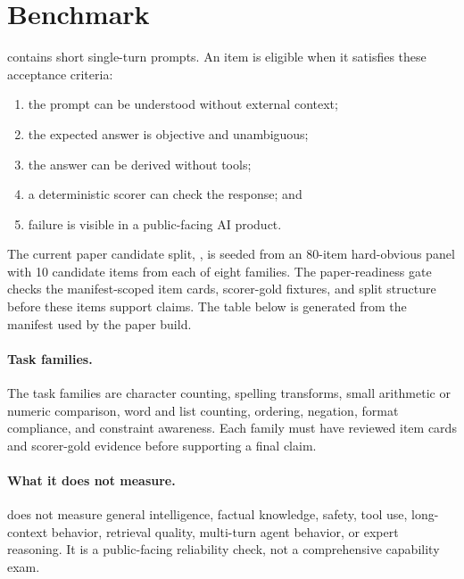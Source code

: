 \section{Benchmark}

\benchmarkname{} contains short single-turn prompts. An item is eligible when
it satisfies these acceptance criteria:

\begin{enumerate}
  \item the prompt can be understood without external context;
  \item the expected answer is objective and unambiguous;
  \item the answer can be derived without tools;
  \item a deterministic scorer can check the response; and
  \item failure is visible in a public-facing AI product.
\end{enumerate}

The current paper candidate split, \paperSplit{}, is seeded from an 80-item
hard-obvious panel with 10 candidate items from each of eight families. The
paper-readiness gate checks the manifest-scoped item cards, scorer-gold
fixtures, and split structure before these items support claims. The table
below is generated from the manifest used by the paper build.

\begin{table}[t]
  \centering
  \caption{Current \paperSplit{} composition generated from the paper
  manifest.}
  \label{tab:dataset-composition}
  
\end{table}

\paragraph{Task families.}
The task families are character counting, spelling transforms, small
arithmetic or numeric comparison, word and list counting, ordering, negation,
format compliance, and constraint awareness. Each family must have reviewed
item cards and scorer-gold evidence before supporting a final claim.

\paragraph{What it does not measure.}
\benchmarkname{} does not measure general intelligence, factual knowledge,
safety, tool use, long-context behavior, retrieval quality, multi-turn agent
behavior, or expert reasoning. It is a public-facing reliability check, not a
comprehensive capability exam.
